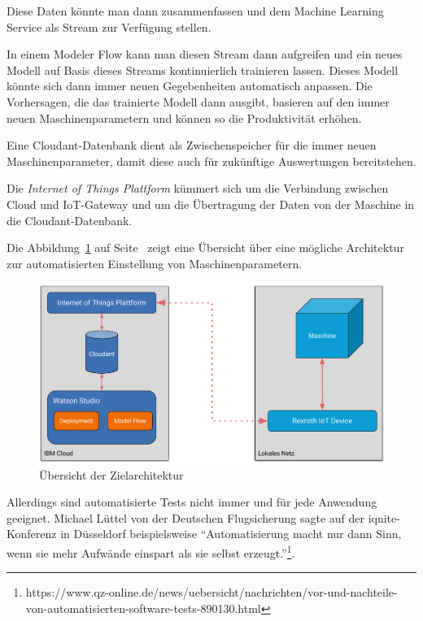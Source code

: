 Diese Daten könnte man dann zusammenfassen und dem Machine Learning Service als Stream zur Verfügung stellen.

In einem Modeler Flow kann man diesen Stream dann aufgreifen und ein neues Modell auf Basis dieses Streams
kontinuierlich trainieren lassen. Dieses Modell könnte sich dann immer neuen Gegebenheiten automatisch anpassen. Die
Vorhersagen, die das trainierte Modell dann ausgibt, basieren auf den immer neuen Maschinenparametern und können
so die Produktivität erhöhen.

Eine Cloudant-Datenbank dient als Zwischenspeicher für die immer neuen Maschinenparameter, damit diese auch für
zukünftige Auswertungen bereitstehen.

Die \textit{Internet of Things Plattform} kümmert sich um die Verbindung zwischen Cloud und IoT-Gateway und um die
Übertragung der Daten von der Maschine in die Cloudant-Datenbank.

Die Abbildung~\ref{fig:ausblick_uebersicht} auf Seite~\pageref{fig:ausblick_uebersicht} zeigt eine Übersicht über eine
mögliche Architektur zur automatisierten Einstellung von Maschinenparametern.

\begin{figure}[h]
    \centering
    \includegraphics[width=\textwidth]{images/kapitel_6/architektur_uebersicht.pdf}
    \caption{Übersicht der Zielarchitektur}
    \label{fig:ausblick_uebersicht}
\end{figure}

Allerdings sind automatisierte Tests nicht immer und für jede Anwendung geeignet. Michael Lüttel von der Deutschen
Flugsicherung sagte auf der iqnite-Konferenz in Düsseldorf beispielsweise \enquote{Automatisierung macht nur dann Sinn,
wenn sie mehr Aufwände einspart als sie selbst
erzeugt.}\footnote{https://www.qz-online.de/news/uebersicht/nachrichten/vor-und-nachteile-von-automatisierten-software-tests-890130.html}.

